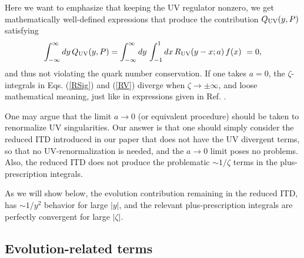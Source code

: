 \documentclass[final,5p,times,twocolumn]{elsarticle}
\begin{document}
Here  we want to emphasize that keeping the UV regulator nonzero,
we get mathematically well-defined expressions that produce 
the contribution  $Q_{\rm UV}(y,P)$ satisfying
  \begin{align}
   \int_{-\infty}^\infty   dy \, Q_{\rm UV}(y,P) =  \int_{-\infty}^\infty   dy \,   \int_{-1}^1 dx\,
R_{\rm UV}  (y-x;a) \, f(x) \ =0 , 
  \label{QUVaint}
\end{align} 
 and thus not violating the quark number conservation.
 If one takes $a=0$, the  $\zeta$-integrals in Eqs. 
 (\ref{RSig})  and   (\ref{RV})  diverge when $\zeta \to \pm \infty$,
 and loose mathematical meaning, 
 just like in  expressions given in Ref.  \cite{Xiong:2013bka}.  
 
 One may argue that the limit $a\to 0$ (or equivalent procedure) 
 should be taken to renormalize UV singularities.
 Our answer is that one should simply   consider  
 the reduced ITD introduced in our paper  \cite{Radyushkin:2017cyf} 
 that does not have the UV divergent terms,
 so that no UV-renormalization is needed, and the $a\to 0$ limit poses no problems. 
 Also,  the reduced ITD  does not produce 
the  problematic $\sim 1/\zeta$  terms in the plus-prescription integrals.

As we will show below, the evolution contribution  remaining in the reduced 
ITD, has $\sim 1/y^2$ behavior 
for large $|y|$, and the relevant 
plus-prescription integrals 
are perfectly convergent for large $|\zeta|$.


\subsection{Evolution-related terms} 
\end{document}
